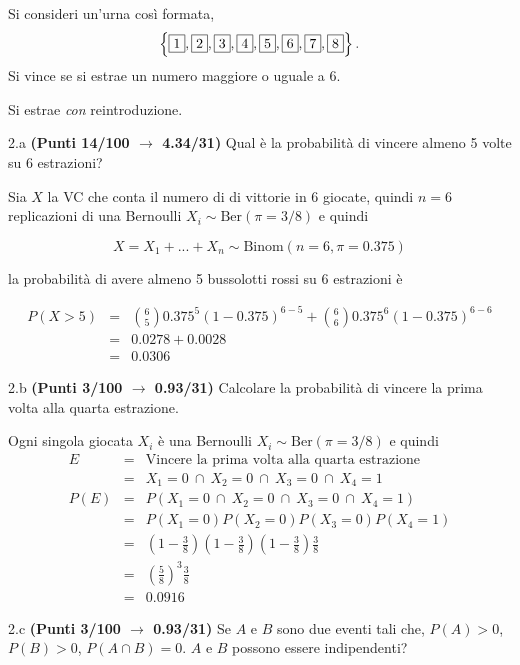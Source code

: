 \documentclass[
  11pt,
]{book}
\theoremstyle{mytheoremstyle}
\theoremstyle{mydefstyle}
\newenvironment{sol}
  {
  \begin{tcolorbox}[enhanced,breakable,arc=0.1mm,boxrule=1pt,colback=white,colframe=iblue,
  title=\bf \fontfamily{lmss}\selectfont \hspace{.5 cm} Soluzione,drop fuzzy shadow]

}{
\end{tcolorbox}
  }
\begin{document}
Si consideri un'urna così formata,
\[
\left\{\fbox{1},\fbox{2},\fbox{3},\fbox{4},\fbox{5},\fbox{6},\fbox{7},\fbox{8}\right\}.
\]
Si vince se si estrae un numero maggiore o uguale a 6.

Si estrae \emph{con} reintroduzione.

2.a \textbf{(Punti 14/100 \(\rightarrow\) 4.34/31)} Qual è la probabilità di vincere almeno 5 volte su 6 estrazioni?

\begin{sol}
Sia \(X\) la VC che conta il numero di di vittorie in 6 giocate,
quindi \(n=6\) replicazioni di una Bernoulli \(X_i\sim\mbox{Ber}(\pi=3/8)\) e quindi

\[
X=X_1+...+X_n\sim\mbox{Binom}(n=6,\pi=0.375)
\]

la probabilità di avere almeno 5 bussolotti rossi su 6 estrazioni è

\normalsize 
\begin{eqnarray*}
      P( X > 5 ) &=& \binom{ 6 }{ 5 } 0.375 ^{ 5 }(1- 0.375 )^{ 6 - 5 }+\binom{ 6 }{ 6 } 0.375 ^{ 6 }(1- 0.375 )^{ 6 - 6 } \\                 &=& 0.0278+0.0028 \\                 &=& 0.0306 
   \end{eqnarray*}
\normalsize 

\end{sol}

2.b \textbf{(Punti 3/100 \(\rightarrow\) 0.93/31)} Calcolare la probabilità di vincere la prima volta alla quarta estrazione.

\begin{sol}
Ogni singola giocata \(X_i\) è una Bernoulli \(X_i\sim\mbox{Ber}(\pi=3/8)\) e quindi
\begin{eqnarray*}
E&=&\text{Vincere la prima volta alla quarta estrazione}\\
 &=& X_1=0~\cap~X_2=0~\cap~X_3=0~\cap~X_4=1\\
P(E)&=&P(X_1=0~\cap~X_2=0~\cap~X_3=0~\cap~X_4=1)\\
&=&P(X_1=0)P(X_2=0)P(X_3=0)P(X_4=1)\\
&=&\left(1-\frac 38\right)\left(1-\frac 38\right)\left(1-\frac 38\right)\frac 38\\
&=&\left(\frac 58\right)^3\frac 38\\
&=&0.0916
\end{eqnarray*}

\end{sol}

2.c \textbf{(Punti 3/100 \(\rightarrow\) 0.93/31)} Se \(A\) e \(B\) sono due eventi tali che, \(P(A)>0\), \(P(B)>0\), \(P(A\cap B)=0\).
\(A\) e \(B\) possono essere indipendenti?
\end{document}
